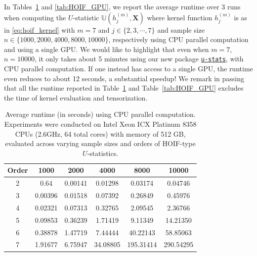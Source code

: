 \documentclass[letterpaper,11pt]{article}
\newcommand{\libref}[2]{\href{#2}{\texttt{#1}}}
\newcommand{\ustat}{\mathbb{U}}
\newcommand{\ustatp}[2]{\ustat(#1,#2)}
\def\package{\libref{u-stats}{https://github.com/zrq1706/U-Statistics-Python}}
\begin{document}
\begin{bibunit}[plainnat]
In Tables~\ref{tab:HOIF_CPU} and \ref{tab:HOIF_GPU}, we report the average runtime over 3 runs when computing the $U$-statistic $\ustatp{h_j^{(m)}}{\bm{X}}$ where kernel function $h_j^{(m)}$ is as in \eqref{eq:hoif_kernel} with $m=7$ and $j \in \{2, 3, \cdots, 7\}$ and sample size $n \in \{1000, 2000, 4000, 8000, 10000\}$, respectively using CPU parallel computation and using a single GPU. We would like to highlight that even when $m = 7$, $n = 10000$, it only takes about 5 minutes using our new package \package{}, with CPU parallel computation. If one instead has access to a single GPU, the runtime even reduces to about 12 seconds, a substantial speedup! We remark in passing that all the runtime reported in Table~\ref{tab:HOIF_CPU} and Table~\ref{tab:HOIF_GPU} excludes the time of kernel evaluation and tensorization.


\begin{table}[ht]
\centering
\caption{Average runtime (in seconds) using CPU parallel computation. Experiments were conducted on Intel Xeon ICX Platinum 8358 CPUs (2.6GHz, 64 total cores) with memory of 512 GB, evaluated across varying sample sizes and orders of HOIF-type $U$-statistics.}
\label{tab:HOIF_CPU}
\begin{tabular}{cccccc}
\toprule
\textbf{Order} & \textbf{1000} & \textbf{2000} & \textbf{4000} & \textbf{8000} & \textbf{10000} \\       
\midrule
2 & 0.64 & 0.00141 & 0.01298 & 0.03174 & 0.04746 \\
3 & 0.00396 & 0.01518 & 0.07392 & 0.26849 & 0.45976 \\
4 & 0.02321 & 0.07313 & 0.32765 & 2.09545 & 2.36766 \\
5 & 0.09853 & 0.36239 & 1.71419 & 9.11349 & 14.21350 \\
6 & 0.38878 & 1.47719 & 7.44444 & 40.22143 & 58.85063 \\
7 & 1.91677 & 6.75947 & 34.08805 & 195.31414 & 290.54295 \\
\bottomrule
\end{tabular}
\end{table}



\end{bibunit}
\end{document}
